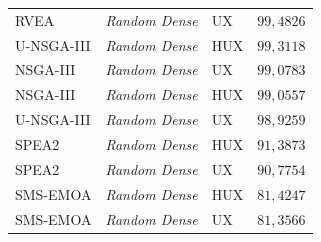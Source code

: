 \begin{longtable}{lllc}
RVEA & \textit{Random Dense} & UX & $99{,}4826$ \\
U-NSGA-III & \textit{Random Dense} & HUX & $99{,}3118$ \\
NSGA-III & \textit{Random Dense} & UX & $99{,}0783$ \\
NSGA-III & \textit{Random Dense} & HUX & $99{,}0557$ \\
U-NSGA-III & \textit{Random Dense} & UX & $98{,}9259$ \\
SPEA2 & \textit{Random Dense} & HUX & $91{,}3873$ \\
SPEA2 & \textit{Random Dense} & UX & $90{,}7754$ \\
SMS-EMOA & \textit{Random Dense} & HUX & $81{,}4247$ \\
SMS-EMOA & \textit{Random Dense} & UX & $81{,}3566$ \\
\end{longtable}
